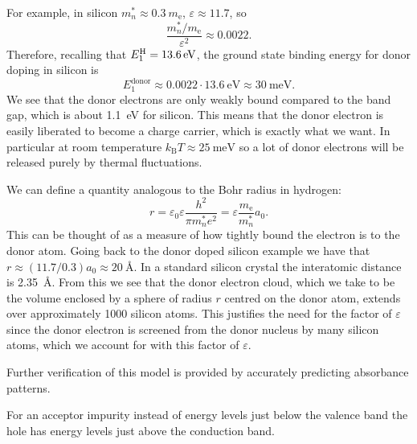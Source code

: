 \documentclass[fleqn]{NotesClass}
\newcommand*{\boltzmann}{k_{\mathrm{B}}}
\newcommand*{\electronmass}{m_{\mathrm{e}}}
\begin{document}
    For example, in silicon \(m_n^* \approx \qty{0.3}{\electronmass}\), \(\varepsilon \approx 11.7\), so
    \begin{equation}
        \frac{m_n^*/m_{\mathrm{e}}}{\varepsilon^2} \approx 0.0022.
    \end{equation}
    Therefore, recalling that \(E_1^{\ce{H}} = \qty{13.6}{\electronvolt}\), the ground state binding energy for donor doping in silicon is
    \begin{equation}
        E_1^{\mathrm{donor}} \approx 0.0022 \cdot \qty{13.6}{\electronvolt} \approx \qty{30}{\milli\electronvolt}.
    \end{equation}
    We see that the donor electrons are only weakly bound compared to the band gap, which is about \qty{1.1}{\electronvolt} for silicon.
    This means that the donor electron is easily liberated to become a charge carrier, which is exactly what we want.
    In particular at room temperature \(\boltzmann T \approx \qty{25}{\milli\electronvolt}\) so a lot of donor electrons will be released purely by thermal fluctuations.
    
    We can define a quantity analogous to the Bohr radius in hydrogen:
    \begin{equation}
        r = \varepsilon_0\varepsilon \frac{h^2}{\pi m_n^*e^2} = \varepsilon\frac{m_{\mathrm{e}}}{m_n^*}a_0.
    \end{equation}
    This can be thought of as a measure of how tightly bound the electron is to the donor atom.
    Going back to the donor doped silicon example we have that \(r \approx (11.7/0.3) a_0 \approx \qty{20}{\angstrom}\).
    In a standard silicon crystal the interatomic distance is \qty{2.35}{\angstrom}.
    From this we see that the donor electron cloud, which we take to be the volume enclosed by a sphere of radius \(r\) centred on the donor atom, extends over approximately 1000 silicon atoms.
    This justifies the need for the factor of \(\varepsilon\) since the donor electron is screened from the donor nucleus by many silicon atoms, which we account for with this factor of \(\varepsilon\).
    
    Further verification of this model is provided by accurately predicting absorbance patterns.
    
    For an acceptor impurity instead of energy levels just below the valence band the hole has energy levels just above the conduction band.
    
\end{document}

